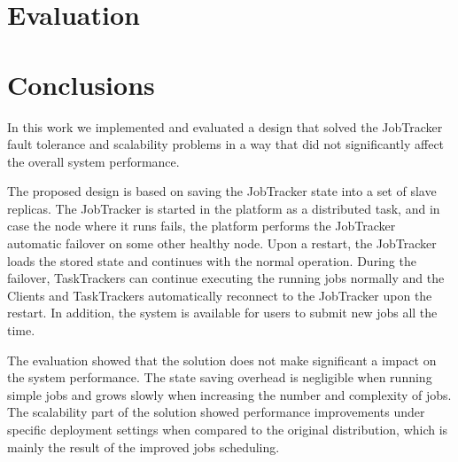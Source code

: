 \documentclass[times, 10pt,twocolumn]{article}
\begin{document}
	\section{Evaluation}

	\section{Conclusions}

    In this work we implemented and evaluated a design that solved the JobTracker fault tolerance and scalability problems in a way that did not significantly affect the overall system performance.
    
    The proposed design is based on saving the JobTracker state into a set of slave replicas. The JobTracker is started in the platform as a distributed task, and in case the node where it runs fails, the platform performs the JobTracker automatic failover on some other healthy node. Upon a restart, the JobTracker loads the stored state and continues with the normal operation. During the failover, TaskTrackers can continue executing the running jobs normally and the Clients and TaskTrackers automatically reconnect to the JobTracker upon the restart. In addition, the system is available for users to submit new jobs all the time.
    
    The evaluation showed that the solution does not make significant a impact on the system performance. The state saving overhead is negligible when running simple jobs and grows slowly when increasing the number and complexity of jobs. The scalability part of the solution showed performance improvements under specific deployment settings when compared to the original distribution, which is mainly the result of the improved jobs scheduling.

	
	
\end{document}
